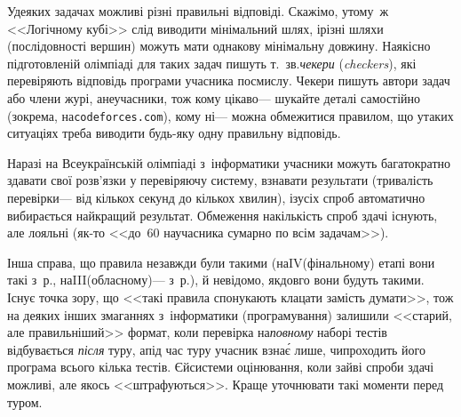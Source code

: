 У\nolinebreak[3] деяких задачах можливі різні правильні відповіді. Скажімо, у\nolinebreak[3] тому~ж <<Логічному кубі>> слід виводити мінімальний шлях, і\nolinebreak[3] різні шляхи (послідовності вершин) можуть мати однакову мінімальну довжину. На\nolinebreak[3] якісно підготовленій олімпіаді для таких задач пишуть т.~зв.\nolinebreak[1] \emph{чекери} (\emph{checkers}), які перевіряють відповідь програми учасника по\nolinebreak[3] смислу. Чекери пишуть автори задач або члени журі, а\nolinebreak[3] не\nolinebreak[3] учасники, тож кому цікаво\nolinebreak[3] --- шукайте деталі самостійно (зокрема, на\nolinebreak[1] \verb"codeforces.com"), кому ні\nolinebreak[3] --- можна обмежитися правилом, що у\nolinebreak[3] таких ситуаціях треба виводити будь-яку одну правильну відповідь.

 Наразі на Всеукраїнській олімпіаді з~інформатики учасники можуть багатократно здавати свої розв'язки у перевіряючу систему, взнавати результати (тривалість перевірки\nolinebreak[3] --- від кількох секунд до кількох хвилин), і\nolinebreak[2] з\nolinebreak[3] усіх спроб автоматично вибирається найкращий результат. Обмеження на\nolinebreak[3] кількість спроб здачі існують, але лояльні (як-то <<до~60 на\nolinebreak[3] учасника сумарно по всім задачам>>). 

Інша справа, що правила не\nolinebreak[3] завжди були такими (на\nolinebreak[2] IV\nolinebreak[3] (фінальному) етапі вони такі з~р., на\nolinebreak[2] III\nolinebreak[3] (обласному)\nolinebreak[3] --- з~р.), й невідомо, як\nolinebreak[3] довго вони будуть такими. Існує точка зору, що <<такі правила спонукають клацати замість думати>>, тож на деяких інших змаганнях з~інформатики (програмування) залишили <<старий, але правильніший>> формат, коли перевірка на\nolinebreak[2] \emph{повному} наборі тестів відбувається \emph{після} туру, а\nolinebreak[3] під час туру учасник взна\'{є} лише, чи\nolinebreak[3] проходить його програма всього кілька тестів. Є\nolinebreak[3] й\nolinebreak[3] системи оцінювання, коли зайві спроби здачі можливі, але якось <<штрафуються>>. Краще уточнювати такі моменти перед туром.

